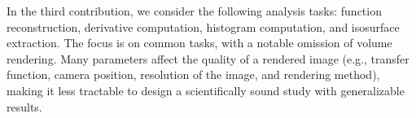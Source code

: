 In the third contribution, we consider the following analysis tasks: function
reconstruction, derivative computation, histogram computation, and isosurface extraction. The focus
is on common tasks, with a notable omission of volume rendering. Many parameters affect the quality
of a rendered image (e.g., transfer function, camera position, resolution of the image, and
rendering method), making it less tractable to design a scientifically sound study with
generalizable results.

